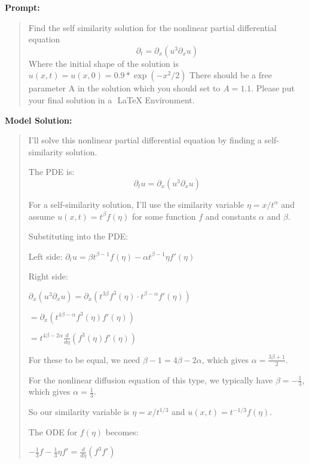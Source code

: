 \documentclass{article}
\begin{document}
\textbf{Prompt:}
\begin{quote}
Find the self similarity solution for the nonlinear partial differential equation $$\partial_t = \partial_x (u^3 \partial_xu) $$ Where the initial shape of the solution is $u(x, t)=u(x, 0)= 0.9 * \exp(-x^2 /2)$ There should be a free parameter A in the solution which you should set to $A =1.1$. Please put your final solution in a $\boxed{}$ LaTeX Environment.
\end{quote}
\textbf{Model Solution:}
\begin{quote}
I'll solve this nonlinear partial differential equation by finding a self-similarity solution.



The PDE is: $$\partial_t u = \partial_x (u^3 \partial_xu)$$



For a self-similarity solution, I'll use the similarity variable $\eta = x/t^{\alpha}$ and assume $u(x,t) = t^{\beta}f(\eta)$ for some function $f$ and constants $\alpha$ and $\beta$.



Substituting into the PDE:



Left side: $\partial_t u = \beta t^{\beta-1}f(\eta) - \alpha t^{\beta-1}\eta f'(\eta)$



Right side: 

$\partial_x (u^3 \partial_xu) = \partial_x (t^{3\beta}f^3(\eta) \cdot t^{\beta-\alpha}f'(\eta))$

$= \partial_x (t^{4\beta-\alpha}f^3(\eta)f'(\eta))$

$= t^{4\beta-2\alpha}\frac{d}{d\eta}(f^3(\eta)f'(\eta))$



For these to be equal, we need $\beta-1 = 4\beta-2\alpha$, which gives $\alpha = \frac{3\beta+1}{2}$.



For the nonlinear diffusion equation of this type, we typically have $\beta = -\frac{1}{3}$, which gives $\alpha = \frac{1}{3}$.



So our similarity variable is $\eta = x/t^{1/3}$ and $u(x,t) = t^{-1/3}f(\eta)$.



The ODE for $f(\eta)$ becomes:

$-\frac{1}{3}f - \frac{1}{3}\eta f' = \frac{d}{d\eta}(f^3f')$




\end{quote}
\end{document}
